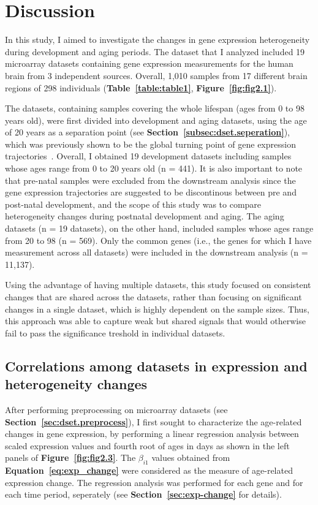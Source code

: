 \chapter{Discussion}
\label{chp:b4}

In this study, I aimed to investigate the changes in gene expression heterogeneity during development and aging periods.
The dataset that I analyzed included 19 microarray datasets containing gene expression measurements for the human brain from 3 independent sources.
Overall, 1,010 samples from 17 different brain regions of 298 individuals (\textbf{Table~\ref{table:table1}}, \textbf{Figure~\ref{fig:fig2.1}}).

The datasets, containing samples covering the whole lifespan (ages from 0 to 98 years old), 
were first divided into development and aging datasets,
using the age of 20 years as a separation point (see \textbf{Section~\ref{subsec:dset.seperation}}), 
which was previously shown to be the global turning point of gene expression trajectories~\cite{Donertas2017, Colantuoni2011, Somel2010}.
Overall, I obtained 19 development datasets including samples whose ages range from 0 to 20 years old (n = 441).
It is also important to note that pre-natal samples were excluded from the downstream analysis
since the gene expression trajectories are suggested to be discontinous between pre and post-natal development, 
and the scope of this study was to compare heterogeneity changes during postnatal development and aging.
The aging datasets (n = 19 datasets), on the other hand, included samples whose ages range from 20 to 98 (n = 569).
Only the common genes (i.e., the genes for which I have measurement across all datasets) were included in the downstream analysis (n = 11,137).

Using the advantage of having multiple datasets, this study focused on consistent changes that are shared across the datasets, 
rather than focusing on significant changes in a single dataset, which is highly dependent on the sample sizes. 
Thus, this approach was able to capture weak but shared signals that would otherwise fail to pass the significance treshold in individual datasets.

\section{Correlations among datasets in expression and heterogeneity changes}
After performing preprocessing on microarray datasets (see \textbf{Section~\ref{sec:dset.preprocess}}), 
I first sought to characterize the age-related changes in gene expression, 
by performing a linear regression analysis between scaled expression values and 
fourth root of ages in days as shown in the left panels of \textbf{Figure~\ref{fig:fig2.3}}.
The $\beta_{i1}$ values obtained from \textbf{Equation~\ref{eq:exp_change}} were considered as the measure of age-related expression change.
The regression analysis was performed for each gene and for each time period, seperately (see \textbf{Section~\ref{sec:exp-change}} for details).

